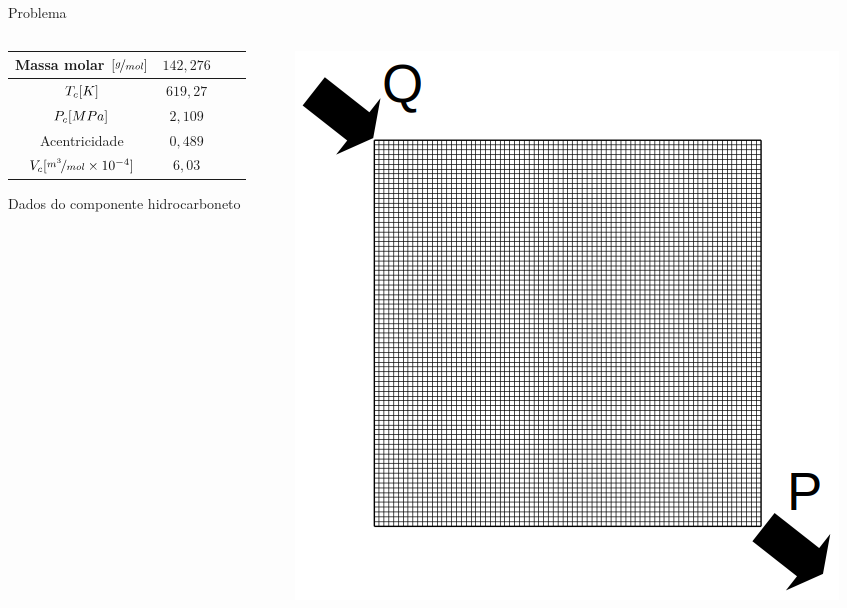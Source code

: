 \documentclass[professionalfont]{beamer}
\begin{document}
\begin{frame}{Problema \theproblem}

    \begin{columns}
        \begin{column}{0.5\textwidth}
            \small
    \begin{table}[!ht]
        \centering
        \begin{subtable}{\textwidth}
            \centering
            \begin{tabular}{|c|c|c|c|}
                \hline
                Massa molar $[\nicefrac{g}{mol}]$ & $142,276$ \\
                \hline
                $T_{c} [K]$ & $619,27 $\\
                \hline
                $P_{c}[MPa]$ & $2,109$\\
                \hline
                Acentricidade & $0,489$\\
                \hline
                $V_{c} [\nicefrac{m^{3}}{mol} \times 10^{-4}]$ & $6,03$\\
                \hline            
            \end{tabular}

            \vspace{0.3cm}

            {\small Dados do componente hidrocarboneto}
            \label{tab:table_prob4.c}
        \end{subtable}
    \end{table}
        \end{column}
        \begin{column}{0.5\textwidth}
            \includegraphics[scale=0.25]{./imgs/prescricao.png}


\end{column}
\end{columns}
\end{frame}
\end{document}
